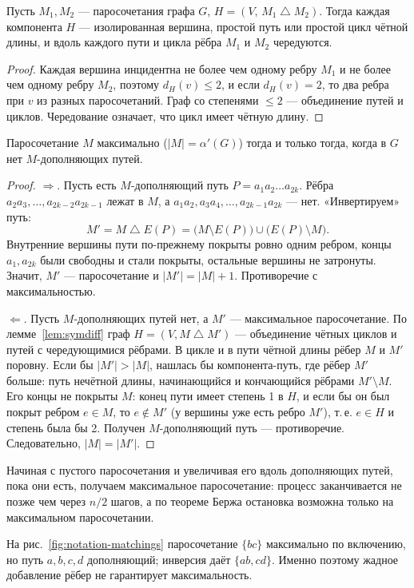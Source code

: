 \begin{lemma}\label{lem:symdiff}
Пусть \(M_1,M_2\) — паросочетания графа \(G\), \(H=(V,\,M_1\mathbin{\triangle}M_2)\).
Тогда каждая компонента \(H\) — изолированная вершина, простой путь или
простой цикл чётной длины, и вдоль каждого пути и цикла рёбра \(M_1\) и \(M_2\)
чередуются.
\end{lemma}
\begin{proof}
Каждая вершина инцидентна не более чем одному ребру \(M_1\) и не более чем
одному ребру \(M_2\), поэтому \(d_H(v)\le2\), и если \(d_H(v)=2\), то два ребра
при \(v\) из разных паросочетаний. Граф со степенями \(\le2\) — объединение
путей и циклов. Чередование означает, что цикл имеет чётную длину.
\end{proof}


\begin{theorem}[Берж, 1957]
Паросочетание \(M\) максимально (\(|M|=\alpha'(G)\)) тогда и только тогда,
когда в \(G\) нет \(M\)-дополняющих путей.
\end{theorem}
\begin{proof}
\(\Rightarrow\). Пусть есть \(M\)-дополняющий путь \(P=a_1a_2\ldots a_{2k}\).
Рёбра \(a_2a_3,\ldots,a_{2k-2}a_{2k-1}\) лежат в \(M\), а
\(a_1a_2,a_3a_4,\ldots,a_{2k-1}a_{2k}\) — нет. «Инвертируем» путь:
\[
M'=M\mathbin{\triangle}E(P)=\bigl(M\setminus E(P)\bigr)\cup\bigl(E(P)\setminus M\bigr).
\]
Внутренние вершины пути по-прежнему покрыты ровно одним ребром, концы
\(a_1,a_{2k}\) были свободны и стали покрыты, остальные вершины не затронуты.
Значит, \(M'\) — паросочетание и \(|M'|=|M|+1\). Противоречие с максимальностью.

\(\Leftarrow\). Пусть \(M\)-дополняющих путей нет, а \(M'\) — максимальное
паросочетание. По лемме~\ref{lem:symdiff} граф \(H=(V,M\mathbin{\triangle}M')\) —
объединение чётных циклов и путей с чередующимися рёбрами. В цикле и в пути
чётной длины рёбер \(M\) и \(M'\) поровну. Если бы \(|M'|>|M|\), нашлась бы
компонента-путь, где рёбер \(M'\) больше: путь нечётной длины, начинающийся и
кончающийся рёбрами \(M'\setminus M\). Его концы не покрыты \(M\): конец пути
имеет степень 1 в \(H\), и если бы он был покрыт ребром \(e\in M\), то
\(e\notin M'\) (у вершины уже есть ребро \(M'\)), т.\,е. \(e\in H\) и степень была бы 2.
Получен \(M\)-дополняющий путь — противоречие. Следовательно, \(|M|=|M'|\).
\end{proof}


\begin{cor}
Начиная с пустого паросочетания и увеличивая его вдоль дополняющих путей,
пока они есть, получаем максимальное паросочетание: процесс заканчивается
не позже чем через \(n/2\) шагов, а по теореме Бержа остановка возможна
только на максимальном паросочетании.
\end{cor}

\begin{example}
На рис.~\ref{fig:notation-matchings} паросочетание \(\{bc\}\) максимально по
включению, но путь \(a,b,c,d\) дополняющий; инверсия даёт \(\{ab,cd\}\).
Именно поэтому жадное добавление рёбер не гарантирует максимальность.
\end{example}
